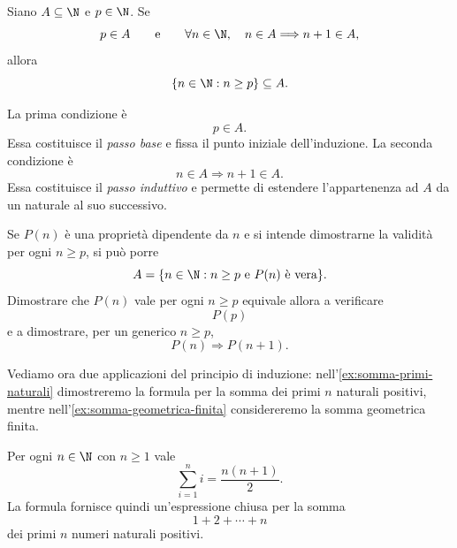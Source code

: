 \begin{theorem}
\label{thm:principio-induzione}
Siano \(A\subseteq\N\) e \(p\in\N\). Se
\[
  p\in A
  \qquad\text{e}\qquad
  \forall n\in\N,\quad n\in A\Longrightarrow n+1\in A,
\]
allora
\[
  \{n\in\N:n\ge p\}\subseteq A.
\]
\end{theorem}

\clearpage

La prima condizione è
\[
  p\in A.
\]
Essa costituisce il \emph{passo base} e fissa il punto iniziale
dell'induzione. La seconda condizione è
\[
  n\in A\Longrightarrow n+1\in A.
\]
Essa costituisce il \emph{passo induttivo} e permette di estendere
l'appartenenza ad \(A\) da un naturale al suo successivo.

Se \(P(n)\) è una proprietà dipendente da \(n\) e si intende dimostrarne
la validità per ogni \(n\ge p\), si può porre
\[
  A=\{n\in\N : n\ge p \text{ e } P(n)\text{ è vera}\}.
\]
Dimostrare che \(P(n)\) vale per ogni \(n\ge p\) equivale allora a
verificare
\[
  P(p)
\]
e a dimostrare, per un generico \(n\ge p\),
\[
  P(n)\Longrightarrow P(n+1).
\]

Vediamo ora due applicazioni del principio di induzione:
nell'\cref{ex:somma-primi-naturali} dimostreremo la formula per la somma
dei primi \(n\) naturali positivi, mentre nell'\cref{ex:somma-geometrica-finita}
considereremo la somma geometrica finita.

\begin{example}
\label{ex:somma-primi-naturali}
Per ogni \(n\in\N\) con \(n\ge1\) vale
\[
  \sum_{i=1}^{n}i=\frac{n(n+1)}2.
\]
La formula fornisce quindi un'espressione chiusa per la somma
\[
  1+2+\cdots+n
\]
dei primi \(n\) numeri naturali positivi.
\end{example}

